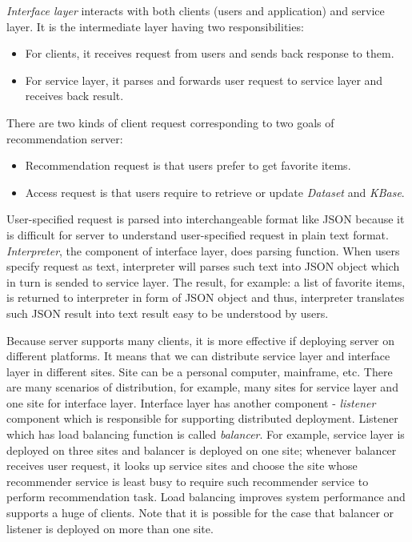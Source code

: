 \documentclass[a4paper]{llncs}
\begin{document}
\textit{Interface layer} interacts with both clients (users and application) and service layer. It is the intermediate layer having two responsibilities:
\begin{itemize}
\item For clients, it receives request from users and sends back response to them.
\item For service layer, it parses and forwards user request to service layer and receives back result.
\end{itemize}
There are two kinds of client request corresponding to two goals of recommendation server:
\begin{itemize}
\item Recommendation request is that users prefer to get favorite items.
\item Access request is that users require to retrieve or update \textit{Dataset} and \textit{KBase}.
\end{itemize}
User-specified request is parsed into interchangeable format like JSON \cite{ecma2013} because it is difficult for server to understand user-specified request in plain text format. \textit{Interpreter}, the component of interface layer, does parsing function. When users specify request as text, interpreter will parses such text into JSON object which in turn is sended to service layer. The result, for example: a list of favorite items, is returned to interpreter in form of JSON object and thus, interpreter translates such JSON result into text result easy to be understood by users.

Because server supports many clients, it is more effective if deploying server on different platforms. It means that we can distribute service layer and interface layer in different sites. Site can be a personal computer, mainframe, etc. There are many scenarios of distribution, for example, many sites for service layer and one site for interface layer. Interface layer has another component - \textit{listener} component which is responsible for supporting distributed deployment. Listener which has load balancing function is called \textit{balancer}. For example, service layer is deployed on three sites and balancer is deployed on one site; whenever balancer receives user request, it looks up service sites and choose the site whose recommender service is least busy to require such recommender service to perform recommendation task. Load balancing improves system performance and supports a huge of clients. Note that it is possible for the case that balancer or listener is deployed on more than one site.
\end{document}
